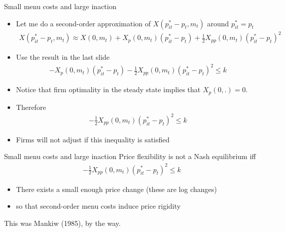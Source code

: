 \documentclass[11pt,aspectratio=169,xcolor={dvipsnames},hyperref={pdftex,pdfpagemode=UseNone,hidelinks,pdfdisplaydoctitle=true},usepdftitle=false]{beamer}
\begin{document}
\begin{frame}{Small menu costs and large inaction}
\begin{itemize}
\item Let me do a second-order approximation of $ X\left(p^*_{it} - p_t, m_t\right) $ around $p^*_{it} = p_t$
\begin{align*}
 X\left(p^*_{it} - p_t, m_t\right) \approx X\left(0, m_t\right) + X_p\left(0, m_t\right)(p^*_{it} - p_t) + \frac{1}{2} X_{pp}\left(0, m_t\right) (p^*_{it} - p_t)^2
\end{align*}
\item Use the result in the last slide
\begin{align*}
-X_p\left(0, m_t\right)(p^*_{it} - p_t) - \frac{1}{2} X_{pp}\left(0, m_t\right) (p^*_{it} - p_t)^2 \leq k
\end{align*}
\item Notice that firm optimality in the steady state implies that $X_p(0,.) = 0$.
\item Therefore
\begin{align*}
 - \frac{1}{2} X_{pp}\left(0, m_t\right) (p^*_{it} - p_t)^2 \leq k
\end{align*}
\item Firms will not adjust if this inequality is satisfied
\end{itemize}
\end{frame}

\begin{frame}{Small menu costs and large inaction}
Price flexibility is not a Nash equilibrium iff
\begin{align*}
 - \frac{1}{2} X_{pp}\left(0, m_t\right) (p^*_{it} - p_t)^2 \leq k
\end{align*}
\begin{itemize}
\item There exists a small enough price change (these are log changes)
\item so that second-order menu costs induce price rigidity
\end{itemize}
This was Mankiw (1985), by the way.
\end{frame}
\end{document}
